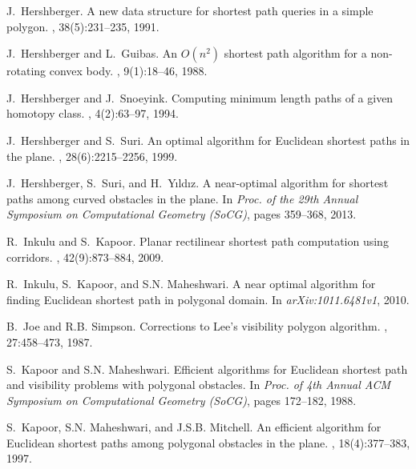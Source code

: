 \documentclass[english,runningheads,11pt]{llncs}
\begin{document}
\begin{thebibliography}{10}
J.~Hershberger.
\newblock A new data structure for shortest path queries in a simple polygon.
, 38(5):231--235, 1991.

J.~Hershberger and L.~Guibas.
\newblock An {$O(n^2)$} shortest path algorithm for a non-rotating convex body.
, 9(1):18--46, 1988.

J.~Hershberger and J.~Snoeyink.
\newblock Computing minimum length paths of a given homotopy class.
, 4(2):63--97,
  1994.

J.~Hershberger and S.~Suri.
\newblock An optimal algorithm for {Euclidean} shortest paths in the plane.
, 28(6):2215--2256, 1999.

J.~Hershberger, S.~Suri, and H.~Y{\i}ld{\i}z.
\newblock A near-optimal algorithm for shortest paths among curved obstacles in
  the plane.
\newblock In {\em Proc. of the 29th Annual Symposium on Computational Geometry
  (SoCG)}, pages 359--368, 2013.

R.~Inkulu and S.~Kapoor.
\newblock Planar rectilinear shortest path computation using corridors.
,
  42(9):873--884, 2009.

R.~Inkulu, S.~Kapoor, and S.N. Maheshwari.
\newblock A near optimal algorithm for finding {Euclidean} shortest path in
  polygonal domain.
\newblock In {\em arXiv:1011.6481v1}, 2010.

B.~Joe and R.B. Simpson.
\newblock Corrections to {Lee's} visibility polygon algorithm.
, 27:458--473, 1987.

S.~Kapoor and S.N. Maheshwari.
\newblock Efficient algorithms for {Euclidean} shortest path and visibility
  problems with polygonal obstacles.
\newblock In {\em Proc. of 4th Annual ACM Symposium on Computational Geometry
  (SoCG)}, pages 172--182, 1988.

S.~Kapoor, S.N. Maheshwari, and J.S.B. Mitchell.
\newblock An efficient algorithm for {Euclidean} shortest paths among polygonal
  obstacles in the plane.
, 18(4):377--383, 1997.


\end{thebibliography}
\end{document}
